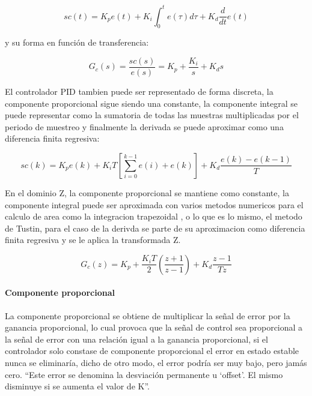             \begin{equation}\label{eq:pidtiempo}
                sc(t) = K_{p}e(t)+  K_{i}\int_{0}^{t} e(\tau) d\tau + K_{d} \frac{d}{dt}e(t)
            \end{equation}
            
            \noindent y su forma en función de transferencia:
            
            \begin{equation}\label{eq:pidcompleja}
                G_{c}(s) = \frac{sc(s)}{e(s)} = K_p + \frac{K_i}{s} + K_d s
            \end{equation}
            
            El controlador PID tambien puede ser representado de forma discreta, la componente proporcional sigue siendo una constante, la componente integral se puede representar como la sumatoria de todas las muestras multiplicadas por el periodo de muestreo y finalmente la derivada se puede aproximar como una diferencia finita regresiva:

            \begin{equation}\label{eq:pidcdiscreto}
                sc(k) = K_{p}e(k)+  K_{i}T\left[\sum_{i=0}^{k-1} e(i) + e(k)\right] + K_{d} \frac{e(k)- e(k-1)}{T}
            \end{equation}

            En el dominio Z, la componente proporcional se mantiene como constante, la componente integral puede ser aproximada con varios metodos numericos para el calculo de area como la integracion trapezoidal \Parencite{kuo1996sistemas}, o lo que es lo mismo, el metodo de Tustin, para el caso de la derivda se parte de su aproximacion como diferencia finita regresiva y se le aplica la transformada Z.

            \begin{equation}\label{eq:pidenZ}
                G_{c}(z) = K_{p} + \frac{K_{i}T}{2}\left(\frac{z+1}{z-1}\right) + K_{d} \frac{z-1}{Tz}
            \end{equation}

            \paragraph{Componente proporcional}

				La componente proporcional se obtiene de multiplicar la señal de error por la ganancia proporcional, lo cual provoca que la señal de control sea proporcional a la señal de error con una relación igual a la ganancia proporcional, si el controlador solo constase de componente proporcional el error en estado estable nunca se eliminaría, dicho de otro modo, el error podría ser muy bajo, pero jamás cero. \enquote{Este error se denomina la desviación permanente u \enquote{offset}. El mismo disminuye si se aumenta el valor de K}\Parencite[p.$\,$54]{nelson1999fundamentos}.

